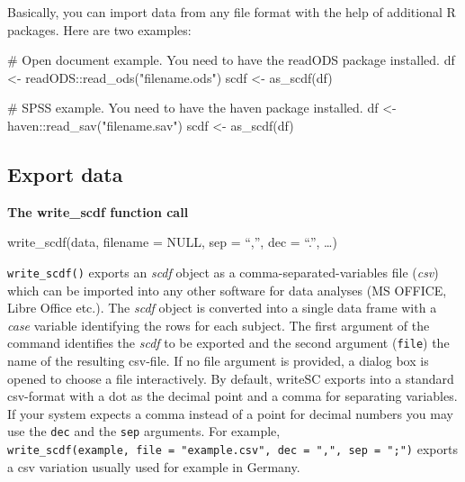 \documentclass[
  letterpaper,
  DIV=11,
  numbers=noendperiod]{scrreprt}
\newenvironment{Shaded}{\begin{snugshade}}{\end{snugshade}}
\newcommand{\CommentTok}[1]{\textcolor[rgb]{0.37,0.37,0.37}{#1}}
\newcommand{\FunctionTok}[1]{\textcolor[rgb]{0.28,0.35,0.67}{#1}}
\newcommand{\NormalTok}[1]{\textcolor[rgb]{0.00,0.23,0.31}{#1}}
\newcommand{\OtherTok}[1]{\textcolor[rgb]{0.00,0.23,0.31}{#1}}
\newcommand{\SpecialCharTok}[1]{\textcolor[rgb]{0.37,0.37,0.37}{#1}}
\newcommand{\StringTok}[1]{\textcolor[rgb]{0.13,0.47,0.30}{#1}}
\begin{document}
Basically, you can import data from any file format with the help of
additional R packages. Here are two examples:

\begin{Shaded}
\begin{Highlighting}[]
\CommentTok{\# Open document example. You need to have the readODS package installed.}
\NormalTok{df }\OtherTok{\textless{}{-}}\NormalTok{ readODS}\SpecialCharTok{::}\FunctionTok{read\_ods}\NormalTok{(}\StringTok{"filename.ods"}\NormalTok{)}
\NormalTok{scdf }\OtherTok{\textless{}{-}} \FunctionTok{as\_scdf}\NormalTok{(df)}

\CommentTok{\# SPSS example. You need to have the haven package installed.}
\NormalTok{df }\OtherTok{\textless{}{-}}\NormalTok{ haven}\SpecialCharTok{::}\FunctionTok{read\_sav}\NormalTok{(}\StringTok{"filename.sav"}\NormalTok{)}
\NormalTok{scdf }\OtherTok{\textless{}{-}} \FunctionTok{as\_scdf}\NormalTok{(df)}
\end{Highlighting}
\end{Shaded}

\hypertarget{sec-write-scdf}{%
\subsection{Export data}\label{sec-write-scdf}}

\begin{tcolorbox}[enhanced jigsaw, breakable, rightrule=.15mm, bottomrule=.15mm, arc=.35mm, colback=white, colframe=quarto-callout-tip-color-frame, opacityback=0, leftrule=.75mm, toprule=.15mm, left=2mm]
\begin{minipage}[t]{5.5mm}
\textcolor{quarto-callout-tip-color}{\faLightbulb}
\end{minipage}%
\begin{minipage}[t]{\textwidth - 5.5mm}

\textbf{The write\_scdf function call}\vspace{2mm}

write\_scdf(data, filename = NULL, sep = ``,'', dec = ``.'', \ldots)

\end{minipage}%
\end{tcolorbox}

\texttt{write\_scdf()} exports an \emph{scdf} object as a
comma-separated-variables file (\emph{csv}) which can be imported into
any other software for data analyses (MS OFFICE, Libre Office etc.). The
\emph{scdf} object is converted into a single data frame with a
\emph{case} variable identifying the rows for each subject. The first
argument of the command identifies the \emph{scdf} to be exported and
the second argument (\texttt{file}) the name of the resulting csv-file.
If no file argument is provided, a dialog box is opened to choose a file
interactively. By default, writeSC exports into a standard csv-format
with a dot as the decimal point and a comma for separating variables. If
your system expects a comma instead of a point for decimal numbers you
may use the \texttt{dec} and the \texttt{sep} arguments. For example,
\texttt{write\_scdf(example,\ file\ =\ "example.csv",\ dec\ =\ ",",\ sep\ =\ ";")}
exports a csv variation usually used for example in Germany.
\end{document}
